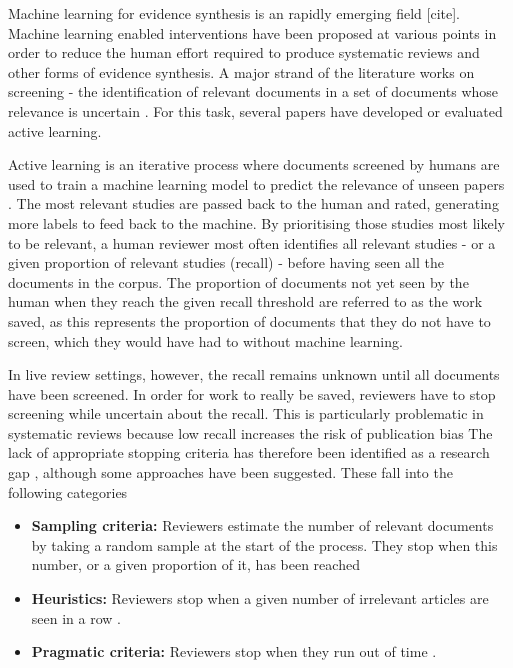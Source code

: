 \documentclass{bmcart}
\begin{document}
	Machine learning for evidence synthesis is an rapidly emerging field [cite].
	Machine learning enabled interventions have been proposed at various points in order to reduce the human effort required to produce systematic reviews and other forms of evidence synthesis.
	A major strand of the literature works on screening - the identification of relevant documents in a set of documents whose relevance is uncertain \cite{OMara-Eves2015}. 
	For this task, several papers have developed or evaluated active learning. 
	
	Active learning is an iterative process where documents screened by humans are used to train a machine learning model to predict the relevance of unseen papers \cite{Settles2009}.
	The most relevant studies are passed back to the human and rated, generating more labels to feed back to the machine. 
	By prioritising those studies most likely to be relevant, a human reviewer most often identifies all relevant studies - or a given proportion of relevant studies (recall) - before having seen all the documents in the corpus. 
	The proportion of documents not yet seen by the human when they reach the given recall threshold are referred to as the work saved, as this represents the proportion of documents that they do not have to screen, which they would have had to without machine learning.
	
	In live review settings, however, the recall remains unknown until all documents have been screened. 
	In order for work to really be saved, reviewers have to stop screening while uncertain about the recall. This is particularly problematic in systematic reviews because low recall increases the risk of publication bias %
	The lack of appropriate stopping criteria has therefore been identified as a research gap \cite{bannach-brown2019}, although some approaches have been suggested. These fall into the following categories
	\begin{itemize}
		\item \textbf{Sampling criteria:} Reviewers estimate the number of relevant documents by taking a random sample at the start of the process. They stop when this number, or a given proportion of it, has been reached \cite{Shemilt2014}
		\item \textbf{Heuristics:} Reviewers stop when a given number of irrelevant articles are seen in a row \cite{Przybya2018}. 
		\item \textbf{Pragmatic criteria:} Reviewers stop when they run out of time \cite{miwa2014}. 
	\end{itemize}
	
\end{document}
